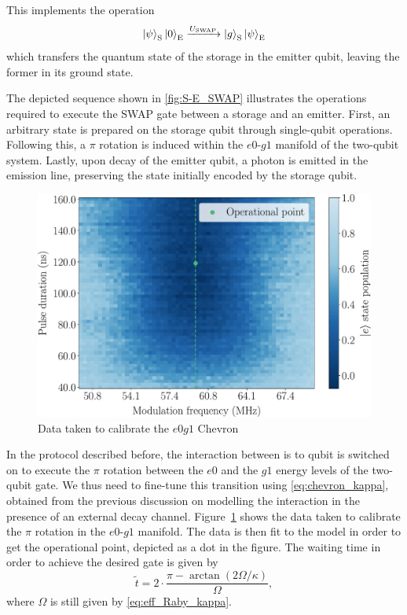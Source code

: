 This implements the operation
\begin{equation}
    \ket{\psi}_{\text{S}} \ket{0}_{\text{E}} \xrightarrow{U_{\text{SWAP}}}
    \ket{g}_{\text{S}} \ket{\psi}_{\text{E}}
\end{equation}
which transfers the quantum state of the storage in the emitter qubit, leaving the former in its ground state.

The depicted sequence shown in \cref{fig:S-E_SWAP} illustrates the operations required to execute the SWAP gate between a storage and an emitter.
First, an arbitrary state is prepared on the storage qubit through single-qubit operations.
Following this, a $\pi$ rotation is induced within the $e0$-$g1$ manifold of the two-qubit system.
Lastly, upon decay of the emitter qubit, a photon is emitted in the emission line, preserving the state initially encoded by the storage qubit.

\begin{figure}
    \centering
    \includegraphics[width = 0.8 \textwidth]{Images/Chap3/SWAP_data.pdf}
    \caption{Data taken to calibrate the $e0g1$ Chevron}
    \label{fig:SWAP_chevrons}
\end{figure}

In the protocol described before, the interaction between is to qubit is switched on to execute the $\pi$ rotation between the $e0$ and the $g1$ energy levels of the two-qubit gate.
We thus need to fine-tune this transition using \cref{eq:chevron_kappa}, obtained from the previous discussion on modelling the interaction in the presence of an external decay channel.
Figure~\ref{fig:SWAP_chevrons} shows the data taken to calibrate the $\pi$ rotation in the $e0$-$g1$ manifold.
The data is then fit to the model in order to get the operational point, depicted as a dot in the figure.
The waiting time in order to achieve the desired gate is given by
\begin{equation}
\label{eq:tilde_t_kappa}
    \widetilde{t} = 2 \cdot \frac{\pi - \arctan(2 \Omega / \kappa )}{\Omega} ,
\end{equation}
where $\Omega$ is still given by \cref{eq:eff_Raby_kappa}.


